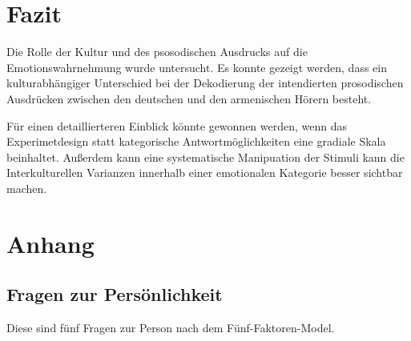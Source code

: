 \documentclass[11pt,a4paper,headsepline,twoside,toc=bibliography]{scrreprt}
\begin{document}
\chapter{Fazit}

Die Rolle der Kultur und des psosodischen Ausdrucks auf die Emotionswahrnehmung wurde untersucht. 
Es konnte gezeigt werden, dass ein kulturabhängiger Unterschied bei der Dekodierung der intendierten prosodischen Ausdrücken zwischen den deutschen und den armenischen Hörern besteht. 

Für einen detaillierteren Einblick könnte gewonnen werden, wenn das Experimetdesign statt kategorische Antwortmöglichkeiten eine gradiale Skala beinhaltet. Außerdem kann eine systematische Manipuation der Stimuli kann die Interkulturellen Varianzen innerhalb einer emotionalen Kategorie besser sichtbar machen. 
\printbibliography

\appendix


\setcounter{secnumdepth}{-1}

\chapter{Anhang}

\setcounter{secnumdepth}{2}

\renewcommand\thesection{\Alph{section}}

\section{Fragen zur Persönlichkeit}
\label{appendix:bigfive}

Diese sind fünf Fragen zur Person nach dem Fünf-Faktoren-Model.   
\end{document}
